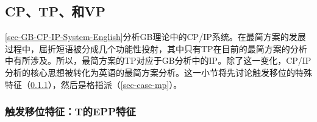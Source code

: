 \subsection{CP、TP、\vPc 和VP}
\label{sec-CP-TP-vP-VP}

\ref{sec-GB-CP-IP-System-English}分析GB理论中的CP/IP系统。在最简方案的发展过程中，屈折短语被分成几个功能性投射\citep{Chomsky89a-u}，其中只有TP在目前的最简方案的分析中有所涉及。所以，最简方案的TP对应于GB分析中的IP。除了这一变化，CP/IP分析的核心思想被转化为英语的最简方案分析。这一小节将先讨论触发移位的特殊特征（\ref{sec-epp-features}），然后是格指派（\ref{sec-case-mp}）。

\subsubsection{触发移位特征：T的EPP特征}
\label{sec-epp-features}

